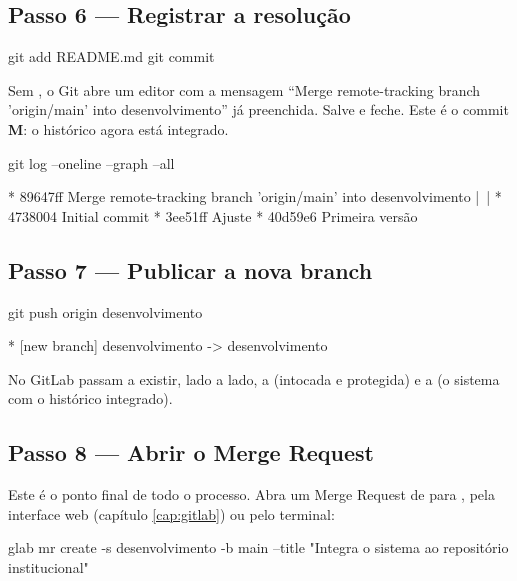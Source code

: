 \subsection*{Passo 6 — Registrar a resolução}

\begin{terminal}
git add README.md
git commit
\end{terminal}

Sem , o Git abre um editor com a mensagem \enquote{Merge remote-tracking branch 'origin/main' into desenvolvimento} já preenchida. Salve e feche. Este é o commit \textbf{M}: o histórico agora está integrado.

\begin{terminal}
git log --oneline --graph --all
\end{terminal}
\begin{saida}
*   89647ff Merge remote-tracking branch 'origin/main' into desenvolvimento
|\
| * 4738004 Initial commit
* 3ee51ff Ajuste
* 40d59e6 Primeira versão
\end{saida}

\subsection*{Passo 7 — Publicar a nova branch}

\begin{terminal}
git push origin desenvolvimento
\end{terminal}
\begin{saida}
 * [new branch]      desenvolvimento -> desenvolvimento
\end{saida}

No GitLab passam a existir, lado a lado, a  (intocada e protegida) e a  (o sistema com o histórico integrado).

\subsection*{Passo 8 — Abrir o Merge Request}

Este é o ponto final de todo o processo. Abra um Merge Request de  para , pela interface web (capítulo \ref{cap:gitlab}) ou pelo terminal:

\begin{terminal}
glab mr create -s desenvolvimento -b main --title "Integra o sistema ao repositório institucional"
\end{terminal}


